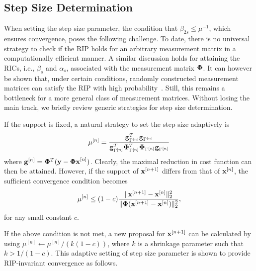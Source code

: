\documentclass{article}
\begin{document}
\subsection{Step Size Determination} 
When setting the step size parameter, the condition that $\beta_{2s}\leq\mu^{-1}$, which ensures convergence, poses the following challenge. To date, there is no universal strategy  to check if the RIP holds for an arbitrary measurement matrix in a computationally efficient manner. A similar discussion holds for attaining the RICs, i.e., ${\beta_s}$ and $\alpha_s$, associated with the measurement matrix ${\bf \Phi}$. It can however be shown that, under certain conditions, randomly constructed measurement matrices can satisfy
the RIP with high probability~\cite{candes2008rip, chartrand2008rip}. Still, this remains a bottleneck for a more general class of
measurement matrices. Without losing the main track, we briefly review generic strategies for step size determination. 

If the support is fixed, a natural strategy to set the step size adaptively is~\cite{blumensath2010niht}
\begin{equation}\label{step_size}
   \mu^{[n]} = \frac{{\bf g}^T_{\Gamma^{[n]}}{\bf g}_{\Gamma^{[n]}}}{{\bf g}^T_{\Gamma^{[n]}}{\bf \Phi}^T_{\Gamma^{[n]}}{\bf \Phi}_{\Gamma^{[n]}}{\bf g}_{\Gamma^{[n]}}}
\end{equation}
where ${\bf g}^{[n]} = {\bf \Phi}^T({\bf y}-{\bf \Phi x}^{[n]})$. Clearly, the maximal reduction in cost function can then be attained. However, if the support of ${\bf x}^{[n+1]}$ differs from that of ${\bf x}^{[n]}$, the sufficient convergence condition  becomes
\begin{equation}
    \mu^{[n]} \leq(1-c) \frac{\|{\bf x}^{[n+1]}-{\bf x}^{[n]} \|_2^2}{\|{\bf \Phi}({\bf x}^{[n+1]}-{\bf x}^{[n]}) \|_2^2},
\end{equation}
for any small constant $c$.

If the above condition is not met, a new proposal for ${\bf x}^{[n+1]}$ can be calculated by using $\mu^{[n]}\leftarrow{\mu^{[n]}/(k(1-c))}$, where $k$ is a shrinkage parameter such that $k>1/(1-c)$.
This adaptive setting of step size parameter is shown to provide RIP-invariant convergence  as follows.
\end{document}
